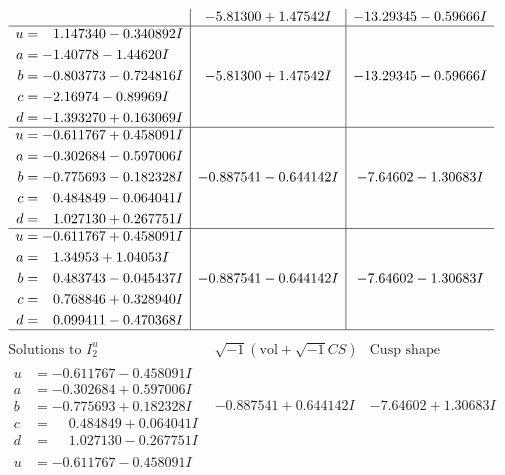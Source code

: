 \documentclass[1p]{elsarticle_modified}
\theoremstyle{definition}
\newcommand{\I}{\sqrt{-1}}
\begin{document}
$$\begin{array}{c|c|c}
 & -5.81300 + 1.47542 I & -13.29345 - 0.59666 I \\ \hline\begin{aligned}
u &= \phantom{-}1.147340 - 0.340892 I \\
a &= -1.40778 - 1.44620 I \\
b &= -0.803773 - 0.724816 I \\
c &= -2.16974 - 0.89969 I \\
d &= -1.393270 + 0.163069 I\end{aligned}
 & -5.81300 + 1.47542 I & -13.29345 - 0.59666 I \\ \hline\begin{aligned}
u &= -0.611767 + 0.458091 I \\
a &= -0.302684 - 0.597006 I \\
b &= -0.775693 - 0.182328 I \\
c &= \phantom{-}0.484849 - 0.064041 I \\
d &= \phantom{-}1.027130 + 0.267751 I\end{aligned}
 & -0.887541 - 0.644142 I & -7.64602 - 1.30683 I \\ \hline\begin{aligned}
u &= -0.611767 + 0.458091 I \\
a &= \phantom{-}1.34953 + 1.04053 I \\
b &= \phantom{-}0.483743 - 0.045437 I \\
c &= \phantom{-}0.768846 + 0.328940 I \\
d &= \phantom{-}0.099411 - 0.470368 I\end{aligned}
 & -0.887541 - 0.644142 I & -7.64602 - 1.30683 I\\
 \hline 
 \end{array}$$\newpage$$\begin{array}{c|c|c}  
\text{Solutions to }I^u_{2}& \I (\text{vol} + \sqrt{-1}CS) & \text{Cusp shape}\\
 \hline 
\begin{aligned}
u &= -0.611767 - 0.458091 I \\
a &= -0.302684 + 0.597006 I \\
b &= -0.775693 + 0.182328 I \\
c &= \phantom{-}0.484849 + 0.064041 I \\
d &= \phantom{-}1.027130 - 0.267751 I\end{aligned}
 & -0.887541 + 0.644142 I & -7.64602 + 1.30683 I \\ \hline\begin{aligned}
u &= -0.611767 - 0.458091 I \\

\end{aligned}
\end{array}$$
\end{document}
